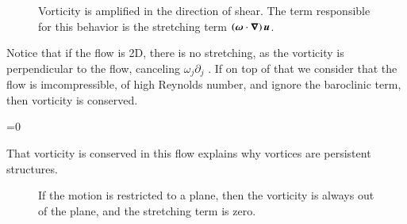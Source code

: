 \begin{figure}
  \begin{center}
  \end{center}
  \caption[]{Vorticity is amplified in the direction of shear. The
    term responsible for this behavior is the stretching term $\left({\boldsymbol{\omega}}\cdot{\boldsymbol{\nabla}}\right){\boldsymbol{u}}$.}
  \label{fig:stretching}
\end{figure}

Notice that if the flow is 2D, there is no stretching, as the
vorticity is perpendicular to the flow, canceling
$\omega_j\partial_j$ . If on top of that we consider that the flow is
imcompressible, of high Reynolds number, and ignore the baroclinic
term, then vorticity is conserved. 

\beq
{}=0 
\eeq

That vorticity is conserved in this flow explains why vortices are
persistent structures. 

\begin{figure}
  \begin{center}
  \end{center}
  \caption[]{If the motion is restricted to a plane, then the
    vorticity is always out of the plane, and the stretching term is zero.}
  \label{fig:stretching2D}
\end{figure}

